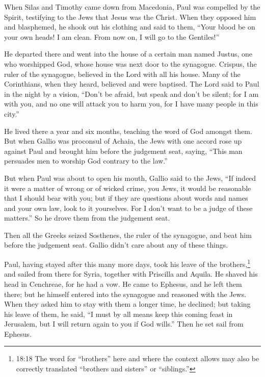  When Silas and Timothy came down from Macedonia, Paul was
compelled by the Spirit, testifying to the Jews that Jesus was the
Christ.  When they opposed him and blasphemed, he shook out
his clothing and said to them, ``Your blood be on your own heads! I am
clean. From now on, I will go to the Gentiles!''

 He departed there and went into the house of a certain man
named Justus, one who worshipped God, whose house was next door to the
synagogue.  Crispus, the ruler of the synagogue, believed in
the Lord with all his house. Many of the Corinthians, when they heard,
believed and were baptised.  The Lord said to Paul in the
night by a vision, ``Don't be afraid, but speak and don't be silent;
 for I am with you, and no one will attack you to harm you,
for I have many people in this city.''

 He lived there a year and six months, teaching the word of
God amongst them.  But when Gallio was proconsul of Achaia,
the Jews with one accord rose up against Paul and brought him before the
judgement seat,  saying, ``This man persuades men to
worship God contrary to the law.''

 But when Paul was about to open his mouth, Gallio said to
the Jews, ``If indeed it were a matter of wrong or of wicked crime, you
Jews, it would be reasonable that I should bear with you; 
but if they are questions about words and names and your own law, look
to it yourselves. For I don't want to be a judge of these matters.''
 So he drove them from the judgement seat.

 Then all the Greeks seized Sosthenes, the ruler of the
synagogue, and beat him before the judgement seat. Gallio didn't care
about any of these things.

 Paul, having stayed after this many more days, took his
leave of the brothers,\footnote{18:18 The word for ``brothers'' here and
  where the context allows may also be correctly translated ``brothers
  and sisters'' or ``siblings.''} and sailed from there for Syria,
together with Priscilla and Aquila. He shaved his head in Cenchreae, for
he had a vow.  He came to Ephesus, and he left them there;
but he himself entered into the synagogue and reasoned with the Jews.
 When they asked him to stay with them a longer time, he
declined;  but taking his leave of them, he said, ``I must
by all means keep this coming feast in Jerusalem, but I will return
again to you if God wills.'' Then he set sail from Ephesus.

